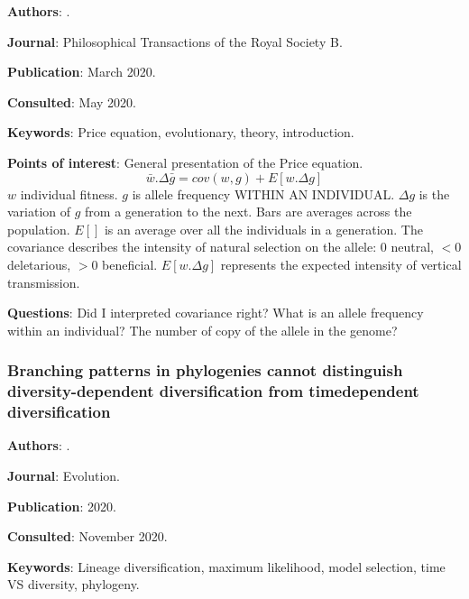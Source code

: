 \documentclass[12pt,a4paper]{article}
\begin{document}
\textbf{Authors}: \cite{lethtonen2020price}.

\textbf{Journal}: Philosophical Transactions of the Royal Society B.

\textbf{Publication}: March 2020.

\textbf{Consulted}: May 2020.

\textbf{Keywords}: Price equation, evolutionary, theory, introduction.

\textbf{Points of interest}: General presentation of the Price equation.
\begin{equation}
\bar{w}.\Delta\bar{g} = cov(w,g) + E[w.\Delta g]
\end{equation}
$w$ individual fitness. $g$ is allele frequency WITHIN AN INDIVIDUAL. $\Delta{g}$ is the variation of $g$ from a generation to the next. Bars are averages across the population. $E[]$ is an average over all the individuals in a generation.
The covariance describes the intensity of natural selection on the allele: 0 neutral, $<0$ deletarious, $>0$ beneficial.
$E[w.\Delta g]$ represents the expected intensity of vertical transmission.

\textbf{Questions}: Did I interpreted covariance right? What is an allele frequency within an individual? The number of copy of the allele in the genome?

\newpage

\subsubsection*{Branching patterns in phylogenies cannot distinguish diversity-dependent diversification from timedependent diversification}

\textbf{Authors}: \cite{pannetier2020branching}.

\textbf{Journal}: Evolution.

\textbf{Publication}: 2020.

\textbf{Consulted}: November 2020.

\textbf{Keywords}: Lineage diversification, maximum likelihood, model selection, time VS diversity, phylogeny.
\end{document}
